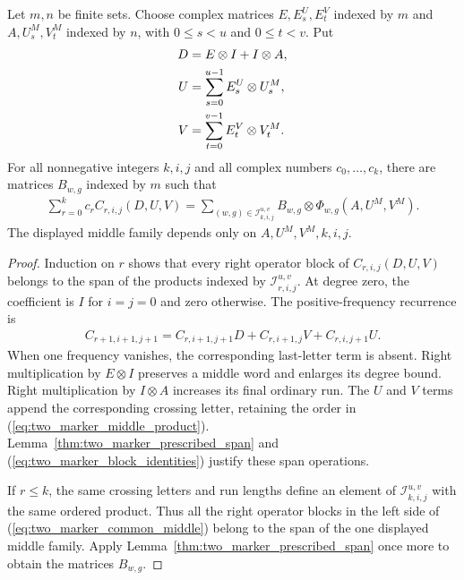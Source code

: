 \begin{lemma}
    \label{thm:two_marker_common_middle}
    \leanok
    Let $m,n$ be finite sets. Choose complex matrices $E,E_s^U,E_t^V$ indexed
    by $m$ and $A,U_s^M,V_t^M$ indexed by $n$, with $0\le s<u$ and $0\le t<v$.
    Put
    \begin{align}
        D & =E\otimes I+I\otimes A,\notag              \\
        U & =\sum_{s=0}^{u-1}E_s^U\otimes U_s^M,\notag \\
        V & =\sum_{t=0}^{v-1}E_t^V\otimes V_t^M.
        \label{eq:two_marker_split_letters}
    \end{align}
    For all nonnegative integers $k,i,j$ and all complex numbers
    $c_0,\ldots,c_k$, there are matrices $B_{w,g}$ indexed by $m$ such that
    \begin{align}
        \sum_{r=0}^k c_r C_{r,i,j}(D,U,V)
        =\sum_{(w,g)\in\mathcal I_{k,i,j}^{u,v}}
        B_{w,g}\otimes\Phi_{w,g}(A,U^M,V^M).
        \label{eq:two_marker_common_middle}
    \end{align}
    The displayed middle family depends only on $A,U^M,V^M,k,i,j$.
\end{lemma}
\begin{proof}\leanok
    Induction on $r$ shows that every right operator block of
    $C_{r,i,j}(D,U,V)$ belongs to the span of the products indexed by
    $\mathcal I_{r,i,j}^{u,v}$. At degree zero, the coefficient is $I$ for
    $i=j=0$ and zero otherwise. The positive-frequency recurrence is
    \begin{align}
        C_{r+1,i+1,j+1}
        =C_{r,i+1,j+1}D+C_{r,i+1,j}V+C_{r,i,j+1}U.
        \label{eq:two_marker_right_recurrence}
    \end{align}
    When one frequency vanishes, the corresponding last-letter term is absent.
    Right multiplication by $E\otimes I$ preserves a middle word and enlarges
    its degree bound. Right multiplication by $I\otimes A$ increases its final
    ordinary run. The $U$ and $V$ terms append the corresponding crossing
    letter, retaining the order in (\ref{eq:two_marker_middle_product}).
    Lemma~\ref{thm:two_marker_prescribed_span} and
    (\ref{eq:two_marker_block_identities}) justify these span operations.

    If $r\le k$, the same crossing letters and run lengths define an element
    of $\mathcal I_{k,i,j}^{u,v}$ with the same ordered product. Thus all the
    right operator blocks in the left side of
    (\ref{eq:two_marker_common_middle}) belong to the span of the one displayed
    middle family. Apply Lemma~\ref{thm:two_marker_prescribed_span} once more
    to obtain the matrices $B_{w,g}$.
\end{proof}

